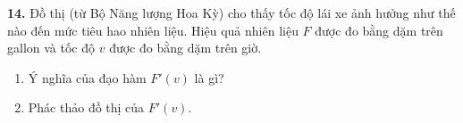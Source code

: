 \begin{minipage}[t]{0.48\textwidth}
  \textbf{14.} Đồ thị (từ Bộ Năng lượng Hoa Kỳ) cho thấy tốc độ lái xe ảnh hưởng như thế nào đến mức tiêu hao nhiên liệu. Hiệu quả nhiên liệu $F$ được đo bằng dặm trên gallon và tốc độ $v$ được đo bằng dặm trên giờ.
  \begin{enumerate}[label=(\alph*), leftmargin=1.5em, itemsep=0pt, topsep=1pt]
    \item Ý nghĩa của đạo hàm $F'(v)$ là gì?
    \item Phác thảo đồ thị của $F'(v)$.
  \end{enumerate}
\end{minipage}

\vspace*{\fill}

